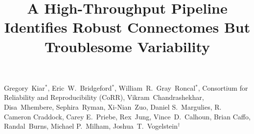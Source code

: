 \documentclass[11pt]{article}
\title{
A High-Throughput Pipeline Identifies Robust Connectomes But Troublesome Variability
}
\begin{document}
\maketitle
\noindent\parbox{0.9\textwidth}{
\normalsize\color{lgray} Gregory~Kiar$^*$, Eric~W.~Bridgeford$^*$,  William~R.~Gray~Roncal$^*$, 
Consortium for Reliability and Reproducibility (CoRR), 
Vikram~Chandrashekhar, Disa~Mhembere,  Sephira~Ryman,  Xi-Nian~Zuo,  Daniel S.~Margulies, R. Cameron Craddock, Carey E.~Priebe,
Rex~Jung, Vince~D.~Calhoun, 
Brian Caffo, Randal~Burns, Michael P.~Milham,  
Joshua~T.~Vogelstein$^\dagger$
\\%
}
\thispagestyle{empty}
\medskip
\vspace{10pt}
\end{document}
